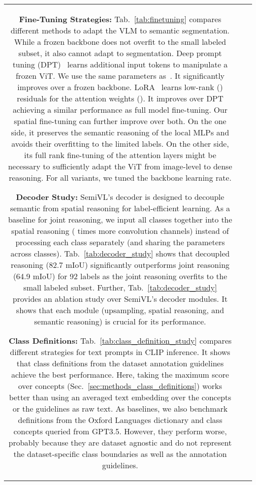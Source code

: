 \documentclass[10pt,twocolumn,letterpaper]{article}
\newcommand{\ours}{SemiVL}
\begin{document}
\begin{figure*}
\begin{tabular}{ccc}
\noindent\textbf{Fine-Tuning Strategies:}
Tab.~\ref{tab:finetuning} compares different methods to adapt the VLM to semantic segmentation. While a frozen backbone does not overfit to the small labeled subset, it also cannot adapt to segmentation. Deep prompt tuning (DPT)~\cite{zhou2022learning,zhou2023zegclip} learns additional input tokens to manipulate a frozen ViT. We use the same parameters as~\cite{zhou2023zegclip}. It significantly improves over a frozen backbone. LoRA~\cite{hu2021lora} learns low-rank () residuals for the attention weights ().
It improves over DPT achieving a similar performance as full model fine-tuning. Our spatial fine-tuning can further improve over both. On the one side, it preserves the semantic reasoning of the local MLPs and avoids their overfitting to the limited labels. On the other side, its full rank fine-tuning of the attention layers might be necessary to sufficiently adapt the ViT from image-level to dense reasoning.
For all variants, we tuned the backbone learning rate.

\noindent\textbf{Decoder Study:}
\ours's decoder is designed to decouple semantic from spatial reasoning for label-efficient learning.
As a baseline for joint reasoning, we input all classes together into the spatial reasoning ( times more convolution channels) instead of processing each class separately (and sharing the parameters across classes).
Tab.~\ref{tab:decoder_study} shows that decoupled reasoning (82.7 mIoU) significantly outperforms joint reasoning (64.9 mIoU) for 92 labels as the joint reasoning overfits to the small labeled subset.
Further, Tab.~\ref{tab:decoder_study} provides an ablation study over \ours's decoder modules. It shows that each module (upsampling, spatial reasoning, and semantic reasoning) is crucial for its performance.

\noindent\textbf{Class Definitions:}
Tab.~\ref{tab:class_definition_study} compares different strategies for text prompts in CLIP inference.
It shows that class definitions from the dataset annotation guidelines achieve the best performance. Here, taking the maximum score over concepts (Sec.~\ref{sec:methods_class_definitions}) works better than using an averaged text embedding over the concepts or the guidelines as raw text. As baselines, we also benchmark definitions from the Oxford Languages dictionary and class concepts queried from GPT3.5. However, they perform worse, probably because they are dataset agnostic and do not represent the dataset-specific class boundaries as well as the annotation guidelines.






\end{tabular}
\end{figure*}
\end{document}
